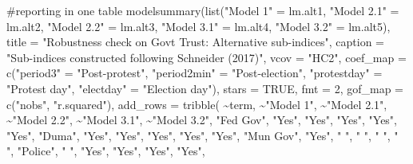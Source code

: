 \documentclass[
  letterpaper,
  DIV=11,
  numbers=noendperiod]{scrartcl}
\newenvironment{Shaded}{\begin{snugshade}}{\end{snugshade}}
\newcommand{\AttributeTok}[1]{\textcolor[rgb]{0.40,0.45,0.13}{#1}}
\newcommand{\CommentTok}[1]{\textcolor[rgb]{0.37,0.37,0.37}{#1}}
\newcommand{\ConstantTok}[1]{\textcolor[rgb]{0.56,0.35,0.01}{#1}}
\newcommand{\DecValTok}[1]{\textcolor[rgb]{0.68,0.00,0.00}{#1}}
\newcommand{\FunctionTok}[1]{\textcolor[rgb]{0.28,0.35,0.67}{#1}}
\newcommand{\NormalTok}[1]{\textcolor[rgb]{0.00,0.23,0.31}{#1}}
\newcommand{\OtherTok}[1]{\textcolor[rgb]{0.00,0.23,0.31}{#1}}
\newcommand{\SpecialCharTok}[1]{\textcolor[rgb]{0.37,0.37,0.37}{#1}}
\newcommand{\StringTok}[1]{\textcolor[rgb]{0.13,0.47,0.30}{#1}}
\begin{document}
\begin{Shaded}
\begin{Highlighting}[]
\CommentTok{\#reporting in one table}
\FunctionTok{modelsummary}\NormalTok{(}\FunctionTok{list}\NormalTok{(}\StringTok{"Model 1"} \OtherTok{=}\NormalTok{ lm.alt1, }\StringTok{"Model 2.1"} \OtherTok{=}\NormalTok{ lm.alt2, }
                  \StringTok{"Model 2.2"} \OtherTok{=}\NormalTok{ lm.alt3, }
                  \StringTok{"Model 3.1"} \OtherTok{=}\NormalTok{ lm.alt4, }
                  \StringTok{"Model 3.2"} \OtherTok{=}\NormalTok{ lm.alt5),}
             \AttributeTok{title =} \StringTok{"Robustness check on Gov\textquotesingle{}t Trust: Alternative sub{-}indices"}\NormalTok{,}
             \AttributeTok{caption =} \StringTok{"Sub{-}indices constructed following Schneider (2017)"}\NormalTok{,}
             \AttributeTok{vcov =} \StringTok{"HC2"}\NormalTok{,}
             \AttributeTok{coef\_map =} \FunctionTok{c}\NormalTok{(}\StringTok{"period3"} \OtherTok{=} \StringTok{"Post{-}protest"}\NormalTok{, }
             \StringTok{"period2min"} \OtherTok{=} \StringTok{"Post{-}election"}\NormalTok{, }\StringTok{"protestday"} \OtherTok{=} \StringTok{"Protest day"}\NormalTok{, }
             \StringTok{"electday"} \OtherTok{=} \StringTok{"Election day"}\NormalTok{),}
             \AttributeTok{stars =} \ConstantTok{TRUE}\NormalTok{, }\AttributeTok{fmt =} \DecValTok{2}\NormalTok{, }\AttributeTok{gof\_map =} \FunctionTok{c}\NormalTok{(}\StringTok{"nobs"}\NormalTok{, }\StringTok{"r.squared"}\NormalTok{),}
             \AttributeTok{add\_rows =} \FunctionTok{tribble}\NormalTok{(}
               \SpecialCharTok{\textasciitilde{}}\NormalTok{term, }\SpecialCharTok{\textasciitilde{}}\StringTok{"Model 1"}\NormalTok{, }\SpecialCharTok{\textasciitilde{}}\StringTok{"Model 2.1"}\NormalTok{, }\SpecialCharTok{\textasciitilde{}}\StringTok{"Model 2.2"}\NormalTok{, }\SpecialCharTok{\textasciitilde{}}\StringTok{"Model 3.1"}\NormalTok{, }\SpecialCharTok{\textasciitilde{}}\StringTok{"Model 3.2"}\NormalTok{,}
               \StringTok{"Fed Gov"}\NormalTok{, }\StringTok{"Yes"}\NormalTok{, }\StringTok{"Yes"}\NormalTok{, }\StringTok{"Yes"}\NormalTok{, }\StringTok{"Yes"}\NormalTok{, }\StringTok{"Yes"}\NormalTok{,}
               \StringTok{"Duma"}\NormalTok{, }\StringTok{"Yes"}\NormalTok{, }\StringTok{"Yes"}\NormalTok{, }\StringTok{"Yes"}\NormalTok{, }\StringTok{"Yes"}\NormalTok{, }\StringTok{"Yes"}\NormalTok{,}
               \StringTok{"Mun Gov"}\NormalTok{, }\StringTok{"Yes"}\NormalTok{, }\StringTok{" "}\NormalTok{, }\StringTok{" "}\NormalTok{, }\StringTok{" "}\NormalTok{, }\StringTok{" "}\NormalTok{,}
               \StringTok{"Police"}\NormalTok{, }\StringTok{" "}\NormalTok{, }\StringTok{"Yes"}\NormalTok{, }\StringTok{"Yes"}\NormalTok{, }\StringTok{"Yes"}\NormalTok{, }\StringTok{"Yes"}\NormalTok{,}

\end{Highlighting}
\end{Shaded}
\end{document}
